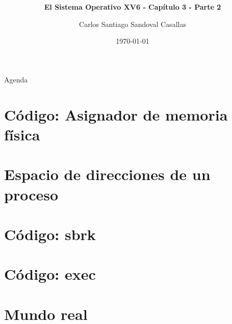 \documentclass{libs/ufc_format}
\title[Sistemas Operativos]{\huge\textbf{}}
\subtitle{\textbf{El Sistema Operativo XV6 - Capítulo 3 - Parte 2}}
\author{Carlos Santiago Sandoval Casallas}
\institute[UNAL]{
  \normalsize{\email{csandovalc@unal.edu.co}}
  \newline
  \department{Departamento de Ingeniería de Sistemas e Industrial}
  \newline
  \ufc
}
\date{\today}
\begin{document}


\begin{frame}
  \maketitle
\end{frame}

\begin{frame}{Agenda}
  \tableofcontents
\end{frame}
\section{Código: Asignador de memoria física}
\section{Espacio de direcciones de un proceso}
\section{Código: sbrk}
\section{Código: exec}
\section{Mundo real}

\end{document}
